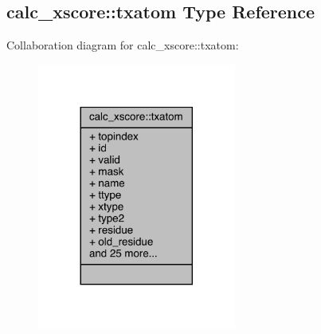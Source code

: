 \hypertarget{structcalc__xscore_1_1txatom}{\subsection{calc\-\_\-xscore\-:\-:txatom Type Reference}
\label{structcalc__xscore_1_1txatom}
}


Collaboration diagram for calc\-\_\-xscore\-:\-:txatom\-:
\nopagebreak
\begin{figure}[H]
\begin{center}
\leavevmode
\includegraphics[width=185pt]{structcalc__xscore_1_1txatom__coll__graph}
\end{center}
\end{figure}
